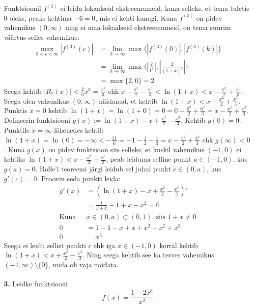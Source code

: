 \documentclass{article}
\begin{document}
Funktsioonil $f^{(3)}$ ei leidu lokaalseid ekstreemumeid, kuna selleks, et tema tuletis 0 oleks, peaks kehtima $-6=0$, mis ei kehti kunagi. Kuna $f^{(3)}$ on pidev vahemikus $(0,\infty)$ ning ei oma lokaalseid ekstreemumeid, on tema suurim v\"a\"artus selles vahemikus:
\begin{equation*}
\begin{aligned}
\max_{0<c<\infty}|f^{(3)}(c)| &= \lim_{k\to\infty}\max\{|f^{(3)}(0)|,|f^{(3)}(k)|\}\\
&=\lim_{k\to\infty}\max\{|\frac{2}{1^3}|, |\frac{2}{(1+k)^3}|\}\\
&=\max\{2,0\} = 2
\end{aligned}
\end{equation*}
Seega kehtib $|R_2(x)|<\frac{2}{6}x^3=\frac{x^3}{3}$ ehk $x-\frac{x^2}{2}-\frac{x^3}{3}<\ln(1+x)<x-\frac{x^2}{2}+\frac{x^3}{3}$. Seega olen vahemikus $(0,\infty)$ n\"aidanud, et kehtib $\ln(1+x)<x-\frac{x^2}{2}+\frac{x^3}{3}$.\\
Punktis $x=0$ kehtib $\ln(1+x)=\ln(1+0)=0=0-\frac{0^2}{2}+\frac{0^3}{3}=x-\frac{x^2}{2}+\frac{x^3}{3}$. Defineerin funktsiooni $g(x):=\ln(1+x)-x+\frac{x^2}{2}-\frac{x^3}{3}$. Kehtib $g(0)=0$. Punktile $x=\infty$ l\"ahenedes kehtib $\ln(1+x)=\ln(0)=-\infty<-\frac{11}{6}=-1-\frac{1}{2}-\frac{1}{3}=x-\frac{x^2}{2}+\frac{x^3}{3}$ ehk $g(\infty)<0$. Kuna $g(x)$ on pidev funktsioon siis selleks, et kuskil vahemikus $(-1,0)$ ei kehtiks $\ln(1+x)<x-\frac{x^2}{2}+\frac{x^3}{3}$, peab leiduma selline punkt $a\in(-1,0)$, kus $g(a)=0$. Rolle'i teoreemi j\"argi leidub sel juhul punkt $c\in(0,a)$, kus $g'(c)=0$. Proovin seda punkti leida:
\begin{equation*}
\begin{aligned}
g'(x)&=(\ln(1+x)-x+\frac{x^2}{2}-\frac{x^3}{3})'\\
&=\frac{1}{1+x}-1+x-x^2=0\\
\text{Kuna }&x\in(0,a)\subset(0,1)\text{, siis }1+x\neq0\\
0&=1-1-x+x+x^2-x^2+x^3\\
0&=x^3
\end{aligned}
\end{equation*}
Seega ei leidu sellist punkti $c$ ehk iga $x\in(-1,0)$ korral kehtib $\ln(1+x)<x+\frac{x^2}{2}-\frac{x^3}{3}$. Ning seega kehtib see ka terves vahemikus $(-1,\infty)\setminus\{0\}$, mida oli vaja n\"aidata.\\\pagebreak\\
\textbf{3.} Leidke funktsiooni\\
\begin{equation*}
f(x)=\frac{1-2x^3}{x^2}
\end{equation*}
\end{document}
